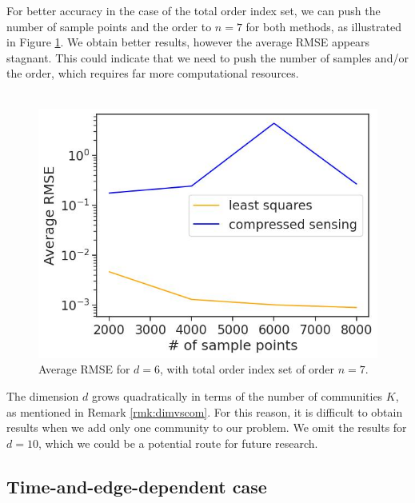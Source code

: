 \documentclass[12pt, oneside]{report}   	%
\begin{document}
For better accuracy in the case of the total order index set, we can push the number of sample points and the order to $n=7$ for both methods, as illustrated in Figure \ref{fig:conv2d6}. We obtain better results, however the average RMSE appears stagnant. This could indicate that we need to push the number of samples and/or the order, which requires far more computational resources.\\\\
\begin{figure}
    \centering
    \includegraphics[scale=0.6]{img/GG_d6n7-7_total-order.jpg}
    \caption{Average RMSE for $d=6$, with total order index set of order $n=7$.}
    \label{fig:conv2d6}
\end{figure}
The dimension $d$ grows quadratically in terms of the number of communities $K$, as mentioned in Remark \ref{rmk:dimvscom}. For this reason, it is difficult to obtain results when we add only one community to our problem. We omit the results for $d=10$, which we could be a potential route for future research.



\subsection{Time-and-edge-dependent case}
\label{subsec:nonconstanttime}
\end{document}
